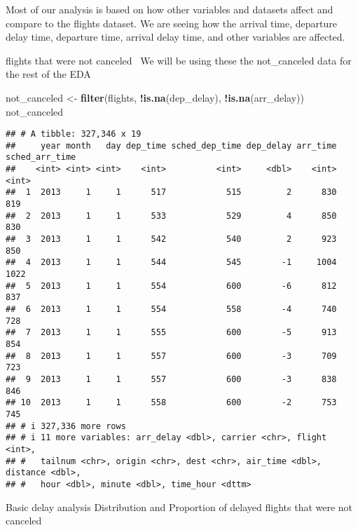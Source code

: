\documentclass[
]{article}
\newenvironment{Shaded}{\begin{snugshade}}{\end{snugshade}}
\newcommand{\AttributeTok}[1]{\textcolor[rgb]{0.13,0.29,0.53}{#1}}
\newcommand{\CommentTok}[1]{\textcolor[rgb]{0.56,0.35,0.01}{\textit{#1}}}
\newcommand{\DecValTok}[1]{\textcolor[rgb]{0.00,0.00,0.81}{#1}}
\newcommand{\FunctionTok}[1]{\textcolor[rgb]{0.13,0.29,0.53}{\textbf{#1}}}
\newcommand{\NormalTok}[1]{#1}
\newcommand{\OtherTok}[1]{\textcolor[rgb]{0.56,0.35,0.01}{#1}}
\newcommand{\SpecialCharTok}[1]{\textcolor[rgb]{0.81,0.36,0.00}{\textbf{#1}}}
\newcommand{\StringTok}[1]{\textcolor[rgb]{0.31,0.60,0.02}{#1}}
\begin{document}
Most of our analysis is based on how other variables and datasets affect
and compare to the flights dataset. We are seeing how the arrival time,
departure delay time, departure time, arrival delay time, and other
variables are affected.

flights that were not canceled ~We will be using these the not\_canceled
data for the rest of the EDA

\begin{Shaded}
\begin{Highlighting}[]
\NormalTok{not\_canceled }\OtherTok{\textless{}{-}} \FunctionTok{filter}\NormalTok{(flights, }\SpecialCharTok{!}\FunctionTok{is.na}\NormalTok{(dep\_delay), }\SpecialCharTok{!}\FunctionTok{is.na}\NormalTok{(arr\_delay))}
\NormalTok{not\_canceled}
\end{Highlighting}
\end{Shaded}

\begin{verbatim}
## # A tibble: 327,346 x 19
##     year month   day dep_time sched_dep_time dep_delay arr_time sched_arr_time
##    <int> <int> <int>    <int>          <int>     <dbl>    <int>          <int>
##  1  2013     1     1      517            515         2      830            819
##  2  2013     1     1      533            529         4      850            830
##  3  2013     1     1      542            540         2      923            850
##  4  2013     1     1      544            545        -1     1004           1022
##  5  2013     1     1      554            600        -6      812            837
##  6  2013     1     1      554            558        -4      740            728
##  7  2013     1     1      555            600        -5      913            854
##  8  2013     1     1      557            600        -3      709            723
##  9  2013     1     1      557            600        -3      838            846
## 10  2013     1     1      558            600        -2      753            745
## # i 327,336 more rows
## # i 11 more variables: arr_delay <dbl>, carrier <chr>, flight <int>,
## #   tailnum <chr>, origin <chr>, dest <chr>, air_time <dbl>, distance <dbl>,
## #   hour <dbl>, minute <dbl>, time_hour <dttm>
\end{verbatim}

Basic delay analysis Distribution and Proportion of delayed flights that
were not canceled

\begin{Shaded}
\end{Shaded}
\end{document}
